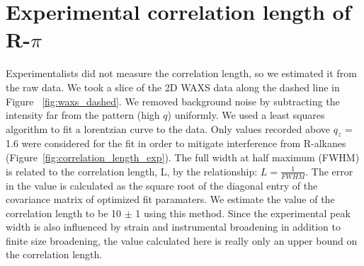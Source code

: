 \documentclass[journal=jpcbfk,manusciprt=article]{achemso}
\begin{document}
  \section{Experimental correlation length of R-$\pi$}\label{section:correlation_length}
 
  \vspace{1em}
  Experimentalists did not measure the correlation length, so we estimated it
  from the raw data. We took a slice of the 2D WAXS data along the dashed line in
  Figure ~\ref{fig:waxs_dashed}. We removed background noise by subtracting the
  intensity far from the pattern (high $q$) uniformly. We used a least squares
  algorithm to fit a lorentzian curve to the data. Only values recorded above
  $q_z$ = 1.6 were considered for the fit in order to mitigate interference from
  R-alkanes (Figure~\ref{fig:correlation_length_exp}). The full width at half
  maximum (FWHM) is related to the correlation length, L, by the relationship: $
  L = \frac{1}{FWHM} $. The error in the value is calculated as the square root
  of the diagonal entry of the covariance matrix of optimized fit paramaters.
  We estimate the value of the correlation length to be 10 $\pm$ 1 using this 
  method. Since the experimental peak width is also influenced by strain and 
  instrumental broadening in addition to finite size broadening, the value 
  calculated here is really only an upper bound on the correlation length. 
\end{document}
